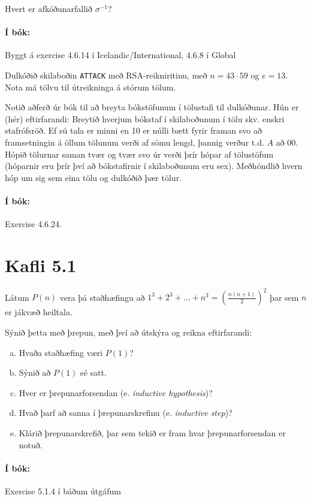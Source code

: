 \documentclass{article}
\begin{document}
Hvert er afkóðunarfallið $\sigma^{-1}$?

\paragraph{Í bók:} Byggt á exercise 4.6.14 í Icelandic/International, 4.6.8 í Global

\question Dulkóðið skilaboðin \texttt{ATTACK} með RSA-reikniritinu, með $n = 43\cdot 59$ og $e=13$. Nota má tölvu til útreikninga á stórum tölum.

Notið aðferð úr bók til að breyta bókstöfunum í tölustafi til dulkóðunar. Hún er (hér) eftirfarandi: Breytið hverjum bókstaf í skilaboðunum í tölu skv. enskri stafrófsröð. Ef sú tala er minni en 10 er núlli bætt fyrir framan svo að framsetningin á öllum tölunum verði af sömu lengd, þannig verður t.d. $A$ að $00$. Hópið tölurnar saman tvær og tvær svo úr verði þrír hópar af tölustöfum (hóparnir eru þrír því að bókstafirnir í skilaboðunum eru sex). Meðhöndlið hvern hóp um sig sem eina tölu og dulkóðið þær tölur.

\paragraph{Í bók:} Exercise 4.6.24.

\section{Kafli 5.1}

\question Látum $P(n)$ vera þá staðhæfingu að $1^3+2^3+\ldots + n^3 = \left( \frac{n(n+1)}{2} \right)^2$ þar sem $n$ er jákvæð heiltala.

Sýnið þetta með þrepun, með því að útskýra og reikna eftirfarandi:

\begin{enumerate}[a)]
    \item Hvaða staðhæfing væri $P(1)$?
    \item Sýnið að $P(1)$ sé satt.
    \item Hver er þrepunarforsendan (e. \emph{inductive hypothesis})?
    \item Hvað þarf að sanna í þrepunarskrefinu (e. \emph{inductive step})?
    \item Klárið þrepunarskrefið, þar sem tekið er fram hvar þrepunarforsendan er notuð.
\end{enumerate}

\paragraph{Í bók:} Exercise 5.1.4 í báðum útgáfum
\end{document}
